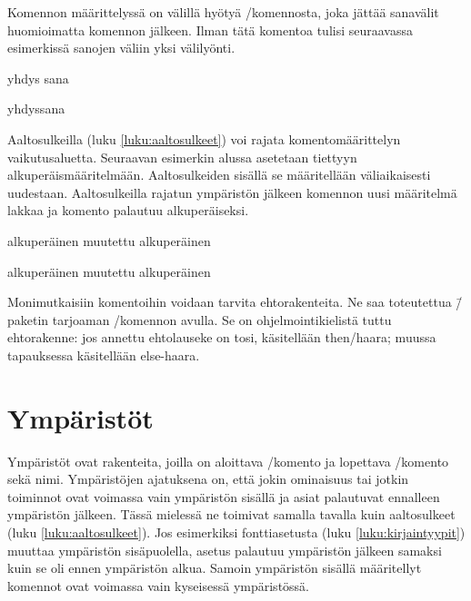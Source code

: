 Komennon määrittelyssä on välillä hyötyä \-/komennosta, joka jättää sanavälit huomioimatta
komennon jälkeen. Ilman tätä komentoa tulisi seuraavassa esimerkissä
sanojen väliin yksi välilyönti.

\pagebreak[3]

\begin{koodilohkosis}
  \newcommand{\komento}[1]{#1\ignorespaces}
  \komento{yhdys}       sana
\end{koodilohkosis}

\begin{tulossis}
  yhdyssana
\end{tulossis}

Aaltosulkeilla (luku \ref{luku:aaltosulkeet}) voi rajata
komentomäärittelyn vai\-ku\-tus\-aluet\-ta. Seuraavan esimerkin alussa
asetetaan  tiettyyn alkuperäismääritelmään.
Aaltosulkeiden sisällä se määritellään väliaikaisesti uudestaan.
Aaltosulkeilla rajatun ympäristön jälkeen komennon uusi määritelmä
lakkaa ja komento palautuu alkuperäiseksi.

\pagebreak[3]

\begin{koodilohkosis}
  \newcommand{\komento}{alkuperäinen}
  \komento
  {%
    \renewcommand{\komento}{muutettu}
    \komento
  }
  \komento
\end{koodilohkosis}

\begin{tulossis}
  alkuperäinen muutettu alkuperäinen
\end{tulossis}

Monimutkaisiin komentoihin voidaan tarvita ehtorakenteita. Ne saa
toteutettua \=/paketin tarjoaman
\-/komennon avulla. Se on
ohjelmointikielistä tuttu ehtorakenne: jos annettu ehtolauseke on tosi,
käsitellään then\-/haara; muussa tapauksessa käsitellään else-haara.

\section{Ympäristöt}

Ympäristöt ovat rakenteita, joilla on aloittava \-/komento ja lopettava \-/komento sekä nimi.
Ympäristöjen ajatuksena on, että jokin ominaisuus tai jotkin toiminnot
ovat voimassa vain ympäristön sisällä ja asiat palautuvat ennalleen
ympäristön jälkeen. Tässä mielessä ne toimivat samalla tavalla kuin
aaltosulkeet (luku \ref{luku:aaltosulkeet}). Jos esimerkiksi
fonttiasetusta (luku \ref{luku:kirjaintyypit}) muuttaa ympäristön
sisäpuolella, asetus palautuu ympäristön jälkeen samaksi kuin se oli
ennen ympäristön alkua. Samoin ympäristön sisällä määritellyt komennot
ovat voimassa vain kyseisessä ympäristössä.

